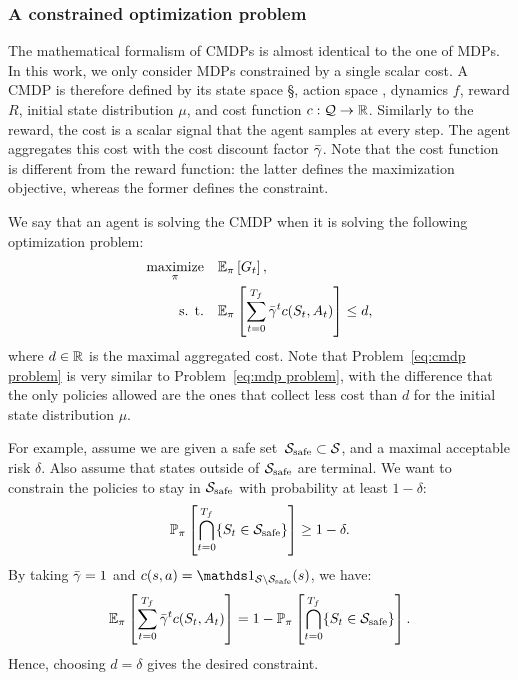 		\subsubsection{A constrained optimization problem}
		The mathematical formalism of CMDPs is almost identical to the one of MDPs. In this work, we only consider MDPs constrained by a single scalar cost. A CMDP is therefore defined by its state space \S, action space \A, dynamics $f$, reward $R$, initial state distribution $\mu$, and cost function $c: \Q\to\R$. Similarly to the reward, the cost is a scalar signal that the agent samples at every step. The agent aggregates this cost with the cost discount factor $\gammabar$. Note that the cost function is different from the reward function: the latter defines the maximization objective, whereas the former defines the constraint.\par
		We say that an agent is solving the CMDP when it is solving the following optimization problem:
		\begin{equation}
		\begin{aligned}
			\underset{\pi}{\text{maximize}} & \quad\expected_\pi\left[G_t\right], \\
			\text{s. t.} & \quad\expected_\pi\left[\sum_{t=0}^\Tf\gammabar^tc(S_t, A_t)\right] \leq d,
		\end{aligned} \label{eq:cmdp problem}
		\end{equation}
		where $d\in\R$ is the maximal aggregated cost. Note that Problem~\eqref{eq:cmdp problem} is very similar to Problem~\eqref{eq:mdp problem}, with the difference that the only policies allowed are the ones that collect less cost than $d$ for the initial state distribution $\mu$.
		
		\begin{example} \label{ex:chance constraints}
			For example, assume we are given a safe set~$\S_\text{safe}\subset\S$, and a maximal acceptable risk $\delta$. Also assume that states outside of $\S_\text{safe}$ are terminal. We want to constrain the policies to stay in $\S_\text{safe}$ with probability at least $1 - \delta$:
			\begin{equation*}
				\P_\pi\left[\bigcap_{t=0}^\Tf\{S_t\in\S_\text{safe}\}\right] \geq 1 - \delta.
			\end{equation*}
			By taking $\gammabar = 1$ and $c(s, a) = \indicator_{\S\setminus\S_\text{safe}}(s)$, we have:
			\begin{equation*}
			\expected_\pi\left[\sum_{t=0}^\Tf\gammabar^tc(S_t, A_t)\right] = 1 - \P_\pi\left[\bigcap_{t=0}^\Tf\{S_t\in\S_\text{safe}\}\right].
			\end{equation*}
			Hence, choosing $d = \delta$ gives the desired constraint.
		\end{example} 
